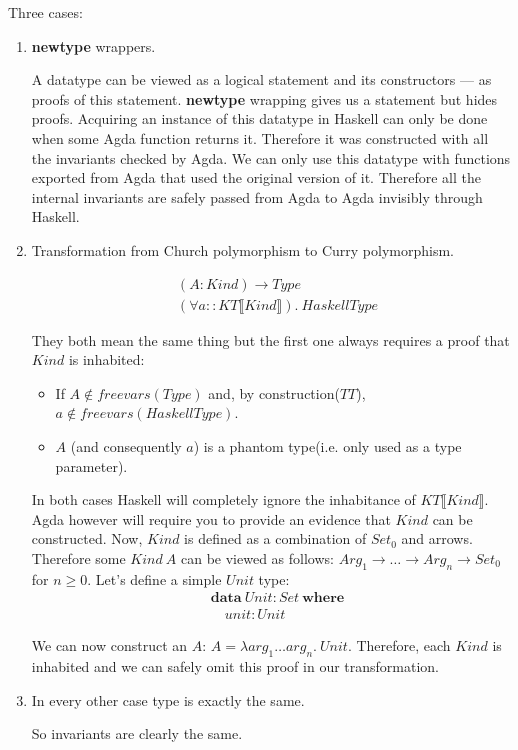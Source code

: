 Three cases:
\begin{enumerate}
\item \textbf{newtype} wrappers.

A datatype can be viewed as a logical statement and its constructors --- as
proofs of this statement. \textbf{newtype} wrapping gives us a statement but
hides proofs. Acquiring an instance of this datatype in Haskell can only be done
when some Agda function returns it. Therefore it was constructed with all the invariants
checked by Agda. We can only use this datatype with functions exported from Agda that
used the original version of it. Therefore all the internal invariants are safely passed
from Agda to Agda invisibly through Haskell.

\item Transformation from Church polymorphism to Curry polymorphism.

\begin{align*}
&(A : Kind) \rightarrow Type \\
&(\forall a :: KT\llbracket Kind \rrbracket).\ HaskellType
\end{align*}

They both mean the same thing but the first one always requires a proof that
\(Kind\) is inhabited:

\begin{itemize}
\item If \(A \not\in freevars(Type)\) and, by construction(\(TT\)), \(a \not\in freevars(HaskellType)\).
\item \(A\) (and consequently \(a\)) is a phantom type(i.e. only used as a type parameter).
\end{itemize}

In both cases Haskell will completely ignore the inhabitance of \(KT\llbracket Kind \rrbracket\).
Agda however will require you to provide an evidence that \(Kind\) can be constructed. Now,
\(Kind\) is defined as a combination of \(Set_0\) and arrows. Therefore some \(Kind\ A\) can be viewed as
follows: \(Arg_1 \rightarrow \ldots \rightarrow Arg_n \rightarrow Set_0\) for \(n \ge 0\).
Let's define a simple \(Unit\) type:
\begin{align*}
   &\mathbf{data}\ Unit : Set\ \mathbf{where}\\
   &\quad unit : Unit
\end{align*}

We can now construct an \(A\): \(A = \lambda arg_1 \ldots arg_n.\ Unit\). Therefore, each \(Kind\)
is inhabited and we can safely omit this proof in our transformation.

\item In every other case type is exactly the same.

So invariants are clearly the same.
\end{enumerate}

